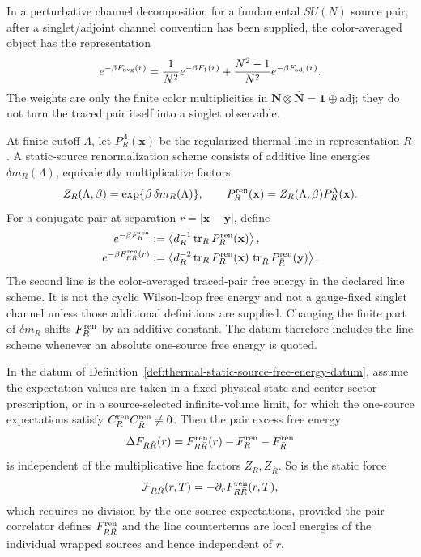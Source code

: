 In a perturbative channel decomposition for a fundamental
\(SU(N)\) source pair, after a singlet/adjoint channel convention has been
supplied, the color-averaged object has the representation
\[
  e^{-\beta F_{\rm avg}(r)}
  =
  \frac1{N^2}e^{-\beta F_1(r)}
  +
  \frac{N^2-1}{N^2}e^{-\beta F_{\rm adj}(r)}.
\]
The weights are only the finite color multiplicities in
\(\mathbf N\otimes\overline{\mathbf N}=\mathbf 1\oplus\mathrm{adj}\); they do
not turn the traced pair itself into a singlet observable.

\begin{definition}
\label{def:thermal-static-source-free-energy-datum}
At finite cutoff \(\Lambda\), let \(P_R^\Lambda(\mathbf x)\) be the
regularized thermal line in representation \(R\).  A static-source
renormalization scheme consists of additive line energies
\(\delta m_R(\Lambda)\), equivalently multiplicative factors
\[
  Z_R(\Lambda,\beta)=\exp\{\beta\,\delta m_R(\Lambda)\},
  \qquad
  P_R^{\rm ren}(\mathbf x)=Z_R(\Lambda,\beta)P_R^\Lambda(\mathbf x).
\]
For a conjugate pair at separation \(r=|\mathbf x-\mathbf y|\), define
\[
\begin{aligned}
  e^{-\beta F_R^{\rm ren}}
  &:=
  \left\langle d_R^{-1}\operatorname{tr}_R
  P_R^{\rm ren}(\mathbf x)\right\rangle,\\
  e^{-\beta F_{R\bar R}^{\rm ren}(r)}
  &:=
  \left\langle d_R^{-2}
  \operatorname{tr}_R P_R^{\rm ren}(\mathbf x)\,
  \operatorname{tr}_{\bar R}P_{\bar R}^{\rm ren}(\mathbf y)
  \right\rangle .
\end{aligned}
\]
The second line is the color-averaged traced-pair free energy in the declared
line scheme.  It is not the cyclic Wilson-loop free energy and not a
gauge-fixed singlet channel unless those additional definitions are supplied.
Changing the finite part of \(\delta m_R\) shifts \(F_R^{\rm ren}\) by an
additive constant.  The datum therefore includes the line scheme whenever an
absolute one-source free energy is quoted.
\end{definition}

\begin{lemma}
\label{lem:thermal-static-source-line-cancellation}
In the datum of Definition~\ref{def:thermal-static-source-free-energy-datum},
assume the expectation values are taken in a fixed physical state and
center-sector prescription, or in a source-selected infinite-volume limit, for
which the one-source expectations satisfy
\(C_R^{\rm ren}C_{\bar R}^{\rm ren}\ne 0\).  Then
the pair excess free energy
\[
  \Delta F_{R\bar R}(r)
  =
  F_{R\bar R}^{\rm ren}(r)-F_R^{\rm ren}-F_{\bar R}^{\rm ren}
\]
is independent of the multiplicative line factors \(Z_R,Z_{\bar R}\).  So is
the static force
\[
  \mathcal F_{R\bar R}(r,T)=-\partial_rF_{R\bar R}^{\rm ren}(r,T),
\]
which requires no division by the one-source expectations, provided the pair
correlator defines \(F_{R\bar R}^{\rm ren}\) and the line counterterms are
local energies of the individual wrapped sources and hence independent of
\(r\).
\end{lemma}

